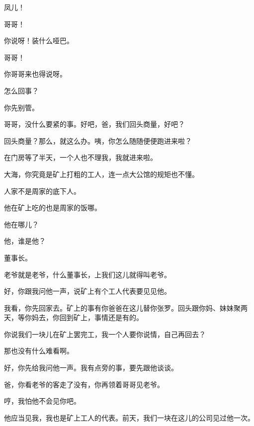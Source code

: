 凤儿！

哥哥！

你说呀！装什么哑巴。

哥哥！

你哥哥来也得说呀。

怎么回事？

你先别管。

哥哥，没什么要紧的事。好吧，爸，我们回头商量，好吧？

回头商量？那么，就这么办。咦，你怎么随随便便跑进来啦？

在门房等了半天，一个人也不理我，我就进来啦。

大海，你究竟是矿上打粗的工人，连一点大公馆的规矩也不懂。

人家不是周家的底下人。

他在矿上吃的也是周家的饭哪。

他在哪儿？

他，谁是他？

董事长。

老爷就是老爷，什么董事长，上我们这儿就得叫老爷。

好，你跟我问他一声，说矿上有个工人代表要见见他。

我看，你先回家去。矿上的事有你爸爸在这儿替你张罗。回头跟你妈、妹妹聚两天，等你妈去，你回到矿上，事情还是有的。

你说我们一块儿在矿上罢完工，我一个人要你说情，自己再回去？

那也没有什么难看啊。

好，你先给我问他一声。我有点旁的事，要先跟他谈谈。

爸，你看老爷的客走了没有，你再领着哥哥见老爷。

哼，我怕他不会见你吧。

他应当见我，我也是矿上工人的代表。前天，我们一块在这儿的公司见过他一次。

